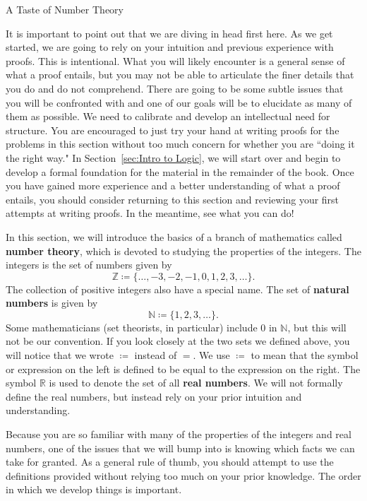 \begin{section}{A Taste of Number Theory}\label{sec:baby number theory}

It is important to point out that we are diving in head first here.  As we get started, we are going to rely on your intuition and previous experience with proofs.  This is intentional. What you will likely encounter is a general sense of what a proof entails, but you may not be able to articulate the finer details that you do and do not comprehend.  There are going to be some subtle issues that you will be confronted with and one of our goals will be to elucidate as many of them as possible. We need to calibrate and develop an intellectual need for structure.  You are encouraged to just try your hand at writing proofs for the problems in this section without too much concern for whether you are ``doing it the right way." In Section~\ref{sec:Intro to Logic}, we will start over and begin to develop a formal foundation for the material in the remainder of the book. Once you have gained more experience and a better understanding of what a proof entails, you should consider returning to this section and reviewing your first attempts at writing proofs. In the meantime, see what you can do!

In this section, we will introduce the basics of a branch of mathematics called \textbf{number theory}, which is devoted to studying the properties of the integers. The integers is the set of numbers given by
\[
\boxed{\mathbb{Z} \coloneqq  \{\ldots, -3, -2, -1, 0, 1, 2, 3, \ldots\}}.
\]
The collection of positive integers also have a special name.  The set of \textbf{natural numbers} is given by
\[
\boxed{\mathbb{N}\coloneqq \{1,2,3,\ldots\}}.
\]
Some mathematicians (set theorists, in particular) include $0$ in $\mathbb{N}$, but this will not be our convention. If you look closely at the two sets we defined above, you will notice that we wrote $\boxed{\coloneqq }$ instead of $=$.  We use $\coloneqq $ to mean that the symbol or expression on the left is defined to be equal to the expression on the right. The symbol $\boxed{\mathbb{R}}$ is used to denote the set of all \textbf{real numbers}. We will not formally define the real numbers, but instead rely on your prior intuition and understanding.

Because you are so familiar with many of the properties of the integers and real numbers, one of the issues that we will bump into is knowing which facts we can take for granted.  As a general rule of thumb, you should attempt to use the definitions provided without relying too much on your prior knowledge.  The order in which we develop things is important.


\end{section}
